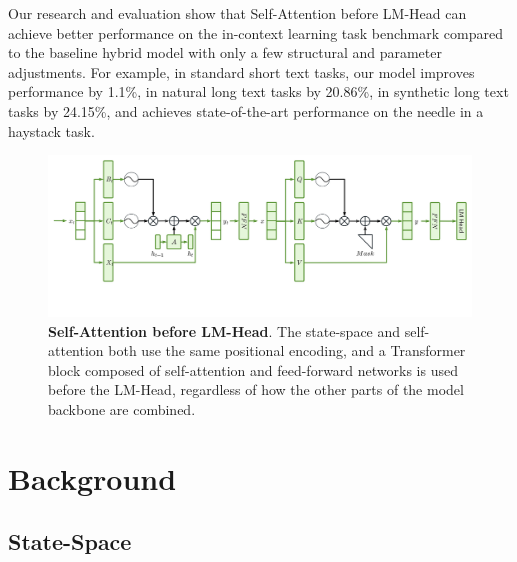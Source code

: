 \documentclass{article}
\theoremstyle{plain}
\theoremstyle{definition}
\theoremstyle{remark}
\begin{document}
Our research and evaluation show that Self-Attention before LM-Head can achieve better performance on the in-context learning task benchmark compared to the baseline hybrid model with only a few structural and parameter adjustments. For example, in standard short text tasks, our model improves performance by 1.1\%, in natural long text tasks by 20.86\%, in synthetic long text tasks by 24.15\%, and achieves state-of-the-art performance on the needle in a haystack task.

\begin{figure}[ht]
   \centering
   \includegraphics[width=\linewidth]{fig/architecture.pdf}
   \caption{
     \textbf{Self-Attention before LM-Head}.
      The state-space and self-attention both use the same positional encoding, and a Transformer block composed of self-attention and feed-forward networks is used before the LM-Head, regardless of how the other parts of the model backbone are combined.
      }
   \label{fig:architecture}
\end{figure}


\section{Background}
\subsection{State-Space}
\end{document}
